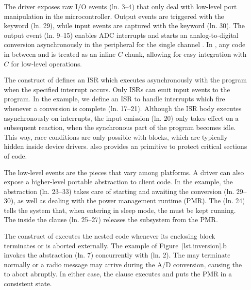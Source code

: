 The driver exposes raw I/O events (ln. 3--4) that only deal with low-level
port manipulation in the microcontroller.
Output events are triggered with the  keyword (ln. 29), while input
events are captured with the  keyword (ln. 30).
%
The output event  (ln. 9--15) enables ADC interrupts and
starts an analog-to-digital conversion asynchronously in the peripheral for
the single channel .
In \CEU, any code in between \code{\{} and \code{\}} is treated as an inline
$C$ chunk, allowing for easy integration with $C$ for low-level operations.

The  construct of \CEU defines an ISR which executes
asynchronously with the program when the specified interrupt occurs.
Only ISRs can emit input events to the program.
In the example, we define an ISR to handle  interrupts which fire
whenever a conversion is complete (ln. 17--21).
%
Although the ISR body executes asynchronously on interrupts, the input emission
(ln. 20) only takes effect on a subsequent reaction, when the synchronous part
of the program becomes idle.
%
This way, race conditions are only possible with  blocks, which
are typically hidden inside device drivers.
\CEU also provides an  primitive to protect critical sections of
code.

The low-level events are the pieces that vary among platforms.
A driver can also expose a higher-level portable abstraction to client code.
%
In the example, the  abstraction (ln. 23--33) takes care of
starting and awaiting the conversion (ln. 29--30), as well as dealing with the
power management runtime (PMR).
%
The  (ln. 24) tells the system that, when entering in
sleep mode, the  must be kept running.
%
The  inside the  clause (ln. 25--27)
releases the  subsystem from the PMR.

The  construct of \CEU executes the nested code whenever its
enclosing block terminates or is aborted externally.
%
The example of Figure~\ref{lst.inversion}.b invokes the 
abstraction (ln. 7) concurrently with  (ln. 2).
%
The  may terminate normally or a radio message may arrive
during the A/D conversion, causing the  to abort abruptly.
In either case, the  clause executes and puts the PMR in a
consistent state.

